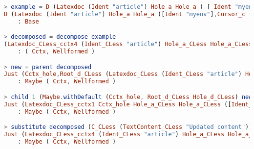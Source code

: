 \begin{minipage}{\textwidth}
    \begin{lstlisting}[style=inline, language=elm, caption={Editing sessions with the \LaTeX \ editor in the Elm REPl}, label={lst:latex-repl}]
> example = D (Latexdoc (Ident "article") Hole_a Hole_a ( [ Ident "myenv" ], Cursor_c (TextContent "Hello World!") ))
D (Latexdoc (Ident "article") Hole_a Hole_a ([Ident "myenv"],Cursor_c (TextContent ("Hello World!"))))
    : Base

> decomposed = decompose example
(Latexdoc_CLess_cctx4 (Ident_CLess "article") Hole_a_CLess Hole_a_CLess ([Ident_CLess "myenv"],Cctx_hole),Root_c_CLess (TextContent_CLess ("Hello World!")))
    : ( Cctx, Wellformed )

> new = parent decomposed
Just (Cctx_hole,Root_d_CLess (Latexdoc_CLess (Ident_CLess "article") Hole_a_CLess Hole_a_CLess ([Ident_CLess "myenv"],TextContent_CLess ("Hello World!"))))
    : Maybe ( Cctx, Wellformed )

> child 1 (Maybe.withDefault (Cctx_hole, Root_d_CLess Hole_d_CLess) new)
Just (Latexdoc_CLess_cctx1 Cctx_hole Hole_a_CLess Hole_a_CLess ([Ident_CLess "myenv"],TextContent_CLess ("Hello World!")),Root_id_CLess (Ident_CLess "article"))
    : Maybe ( Cctx, Wellformed )

> substitute decomposed (C_CLess (TextContent_CLess "Updated content"))
Just (Latexdoc_CLess_cctx4 (Ident_CLess "article") Hole_a_CLess Hole_a_CLess ([Ident_CLess "myenv"],Cctx_hole),Root_c_CLess (TextContent_CLess ("Updated content")))
    : Maybe ( Cctx, Wellformed )
\end{lstlisting}
\end{minipage}